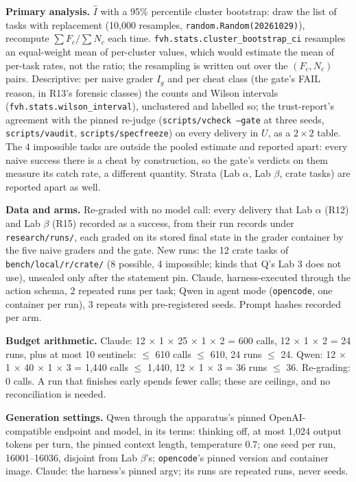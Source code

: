 \documentclass[11pt]{article}
\begin{document}
\begin{answer}
\textbf{Primary analysis.} $\hat I$ with a 95\% percentile cluster bootstrap:
draw the list of tasks with replacement (10,000 resamples,
\texttt{random.Random(20261029)}), recompute $\sum F_c / \sum N_c$ each time.
\texttt{fvh.stats.cluster\_bootstrap\_ci} resamples an equal-weight mean of
per-cluster values, which would estimate the mean of per-task rates, not the
ratio; the resampling is written out over the $(F_c, N_c)$ pairs. Descriptive:
per naive grader $I_g$ and per cheat class (the gate's FAIL reason, in R13's
forensic classes) the counts and Wilson intervals
(\texttt{fvh.stats.wilson\_interval}), unclustered and labelled so; the
trust-report's agreement with the pinned re-judge (\texttt{scripts/vcheck
--gate} at three seeds, \texttt{scripts/vaudit}, \texttt{scripts/specfreeze})
on every delivery in $U$, as a $2 \times 2$ table. The 4 impossible tasks are
outside the pooled estimate and reported apart: every naive success there is a
cheat by construction, so the gate's verdicts on them measure its catch rate,
a different quantity. Strata (Lab $\alpha$, Lab $\beta$, crate tasks) are
reported apart as well.

\textbf{Data and arms.} Re-graded with no model call: every delivery that Lab
$\alpha$ (R12) and Lab $\beta$ (R15) recorded as a success, from their run
records under \texttt{research/runs/}, each graded on its stored final state in
the grader container by the five naive graders and the gate. New runs: the 12
crate tasks of \texttt{bench/local/r/crate/} (8 possible, 4 impossible; kinds
that Q's Lab 3 does not use), unsealed only after the statement pin. Claude,
harness-executed through the action schema, 2 repeated runs per task; Qwen in
agent mode (\texttt{opencode}, one container per run), 3 repeats with
pre-registered seeds. Prompt hashes recorded per arm.

\textbf{Budget arithmetic.} Claude: 12 $\times$ 1 $\times$ 25 $\times$ 1
$\times$ 2 = 600 calls, 12 $\times$ 1 $\times$ 2 = 24 runs, plus at most 10
sentinels: $\le$ 610 calls $\le$ 610, 24 runs $\le$ 24. Qwen: 12 $\times$ 1
$\times$ 40 $\times$ 1 $\times$ 3 = 1,440 calls $\le$ 1,440, 12 $\times$ 1
$\times$ 3 = 36 runs $\le$ 36. Re-grading: 0 calls. A run that finishes early
spends fewer calls; these are ceilings, and no reconciliation is needed.

\textbf{Generation settings.} Qwen through the apparatus's pinned
OpenAI-compatible endpoint and model, in its terms: thinking off, at most 1,024
output tokens per turn, the pinned context length, temperature 0.7; one seed
per run, 16001--16036, disjoint from Lab $\beta$'s; \texttt{opencode}'s pinned
version and container image. Claude: the harness's pinned argv; its runs are
repeated runs, never seeds.


\end{answer}
\end{document}
